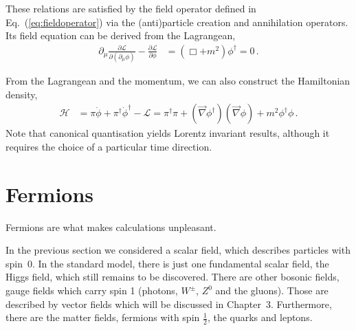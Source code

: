 \documentclass[12pt]{report}
\renewcommand{\L}{\ensuremath{\mathscr{L}}}
\newcommand{\2}{\ensuremath{\sqrt{2}\,}}
\renewcommand{\L}{\ensuremath{\mathscr{L}}}
\begin{document}
{      These relations are satisfied by the field operator defined in Eq.~(\ref{eq:fieldoperator})
      via the (anti)particle creation and annihilation operators. Its field equation can be derived
      from the Lagrangean,
      \begin{align}
        \partial_\mu \frac{\partial \L}{\partial(\partial_\mu \phi)} -\frac{\partial \L}{\partial
          \phi}&=\left(\Box+m^2\right) \phi^\dagger =0 \,.      
      \end{align}
      
      From the Lagrangean and the momentum, we can also construct the Hamiltonian density, 
      \begin{align}
        \mathscr{H}&= \pi \dot{\phi} +\pi^\dagger \dot{\phi}^\dagger- \L = \pi^\dagger \pi
        +\left(\vec{\nabla} \phi^\dagger\right)\left(\vec{\nabla} \phi\right) +m^2\phi^\dagger
        \phi\,. 
      \end{align}
      Note that canonical quantisation yields Lorentz invariant results,
      although it requires the choice of a particular time direction.
    


    \section{Fermions}
      Fermions are what makes calculations unpleasant.

      In the previous section we considered a scalar field, which describes particles with spin~0.
      In the standard model, there is just one fundamental scalar field, the Higgs field, which still
      remains to be discovered. There are other bosonic fields, gauge fields which carry spin 1
      (photons, $W^\pm$, $Z^0$ and the gluons). Those are described by vector fields which 
      will be discussed in Chapter~3. Furthermore, there are the matter fields, fermions with spin
      $\frac{1}{2}$, the quarks and leptons. 

}
\end{document}
